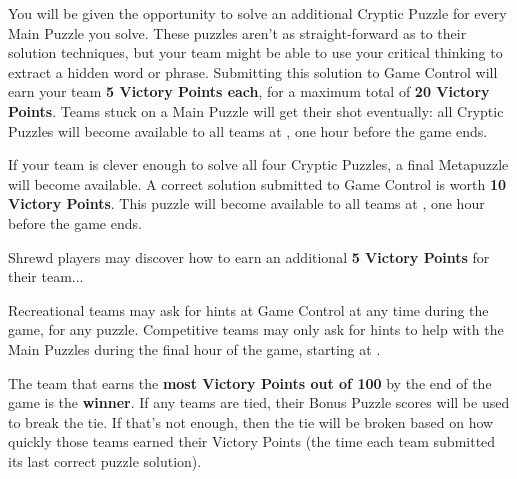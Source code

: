 
You will be given the opportunity to solve an additional Cryptic Puzzle for
every Main Puzzle you solve. These puzzles aren't as straight-forward
as to their solution techniques, but your team might be able to use your
critical thinking to extract a hidden word or phrase. Submitting this
solution to Game Control will earn your team \textbf{5 Victory Points each},
for a maximum total of \textbf{20 Victory Points}.
Teams stuck on a Main Puzzle will get their shot eventually: all
Cryptic Puzzles will become available to all teams at \underline{\hspace{5em}},
one hour before the game ends.


If your team is clever enough to solve all four Cryptic Puzzles, a final
Metapuzzle will become available. A correct solution submitted to Game
Control is worth \textbf{10 Victory Points}. This puzzle will become available
to all teams at \underline{\hspace{5em}},
one hour before the game ends.


Shrewd players may discover how to earn an additional
\textbf{5 Victory Points} for their team...


Recreational teams may ask for hints at Game Control at any time during
the game, for any puzzle. Competitive teams may only ask for hints to help with
the Main Puzzles during the final hour of the game, starting at
\underline{\hspace{5em}}.


The team that earns the \textbf{most Victory Points out of 100}
by the end of the game is the \textbf{winner}. If any teams are tied,
their Bonus Puzzle scores will be used to break the tie. If that's not enough,
then the tie will be broken based on how quickly those teams earned their
Victory Points (the time each team submitted its last correct puzzle solution).

\newpage


